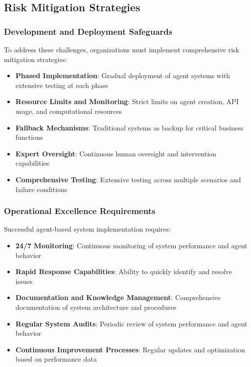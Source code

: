 \subsection{Risk Mitigation Strategies}

\subsubsection{Development and Deployment Safeguards}

To address these challenges, organizations must implement comprehensive risk mitigation strategies:

\begin{itemize}
    \item \textbf{Phased Implementation}: Gradual deployment of agent systems with extensive testing at each phase
    \item \textbf{Resource Limits and Monitoring}: Strict limits on agent creation, API usage, and computational resources
    \item \textbf{Fallback Mechanisms}: Traditional systems as backup for critical business functions
    \item \textbf{Expert Oversight}: Continuous human oversight and intervention capabilities
    \item \textbf{Comprehensive Testing}: Extensive testing across multiple scenarios and failure conditions
\end{itemize}

\subsubsection{Operational Excellence Requirements}

Successful agent-based system implementation requires:

\begin{itemize}
    \item \textbf{24/7 Monitoring}: Continuous monitoring of system performance and agent behavior
    \item \textbf{Rapid Response Capabilities}: Ability to quickly identify and resolve issues
    \item \textbf{Documentation and Knowledge Management}: Comprehensive documentation of system architecture and procedures
    \item \textbf{Regular System Audits}: Periodic review of system performance and agent behavior
    \item \textbf{Continuous Improvement Processes}: Regular updates and optimization based on performance data
\end{itemize}

